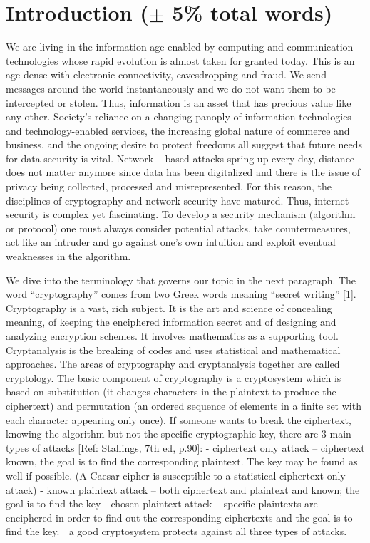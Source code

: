 \section{Introduction ($\pm$ 5\% total words)}
We are living in the information age enabled by computing and communication technologies whose rapid evolution is almost taken for granted today. This is an age dense with electronic connectivity, eavesdropping and fraud. We send messages around the world instantaneously and we do not want them to be intercepted or stolen. Thus, information is an asset that has precious value like any other. Society’s reliance on a changing panoply of information technologies and technology-enabled services, the increasing global nature of commerce and business, and the ongoing desire to protect freedoms all suggest that future needs for data security is vital.  Network – based attacks spring up every day, distance does not matter anymore since data has been digitalized and there is the issue of privacy being collected, processed and misrepresented. For this reason, the disciplines of cryptography and network security have matured. Thus, internet security is complex yet fascinating. To develop a security mechanism (algorithm or protocol) one must always consider potential attacks, take countermeasures, act like an intruder and go against one’s own intuition and exploit eventual weaknesses in the algorithm. 

We dive into the terminology that governs our topic in the next paragraph. The word “cryptography” comes from two Greek words meaning “secret writing” [1]. Cryptography is a vast, rich subject. It is the art and science of concealing meaning, of keeping the enciphered information secret and of designing and analyzing encryption schemes. It involves mathematics as a supporting tool. Cryptanalysis is the breaking of codes and uses statistical and mathematical approaches. The areas of cryptography and cryptanalysis together are called cryptology. The basic component of cryptography is a cryptosystem which is based on substitution (it changes characters in the plaintext to produce the ciphertext) and permutation (an ordered sequence of elements in a finite set with each character appearing only once).
If someone wants to break the ciphertext, knowing the algorithm but not the specific cryptographic key,  there are 3 main types of attacks [Ref: Stallings, 7th ed, p.90]: 
-	ciphertext only attack – ciphertext known, the goal is to find the corresponding plaintext. The key may be found as well if possible. (A Caesar cipher is susceptible to a statistical ciphertext-only attack)
-	known plaintext attack – both ciphertext and plaintext and known; the goal is to find the key
-	chosen plaintext attack – specific plaintexts are enciphered in order to find out the corresponding ciphertexts and the goal is to find the key.
	a good cryptosystem protects against all three types of attacks. 


